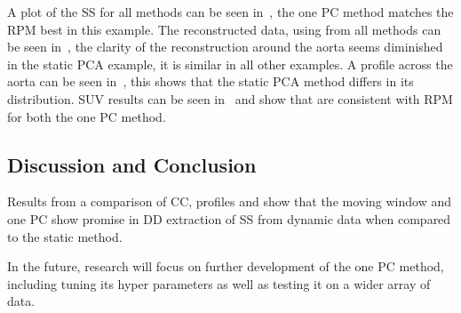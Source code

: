             A plot of the \gls{SS} for all methods can be seen in~, the one \gls{PC} method matches the \gls{RPM} best in this example. The reconstructed data, using  from all methods can be seen in~, the clarity of the reconstruction around the aorta seems diminished in the static \gls{PCA} example, it is similar in all other examples. A profile across the aorta can be seen in~, this shows that the static \gls{PCA} method differs in its distribution. \gls{SUV} results can be seen in~ and show that  are consistent with \gls{RPM} for both the one \gls{PC} method.
            
        \subsection{Discussion and Conclusion} \label{sec:pca_data_driven_surrogate_signal_extraction_methods_for_dynamic_pet_discussion_and_conclusion}
            Results from a comparison of \gls{CC}, profiles and  show that the moving window and one \gls{PC} show promise in \gls{DD} extraction of \gls{SS} from dynamic data when compared to the static method.
            
            In the future, research will focus on further development of the one \gls{PC} method, including tuning its hyper parameters as well as testing it on a wider array of data.
    
        
        
            
        
            
